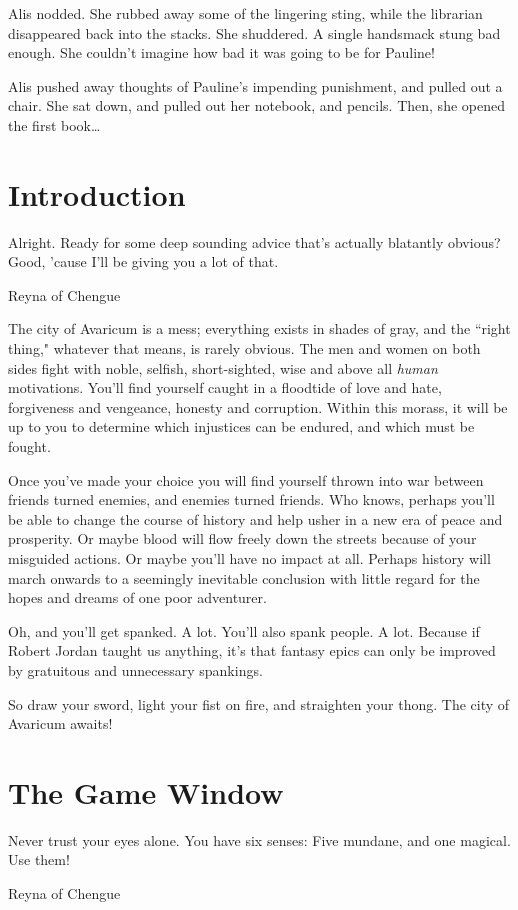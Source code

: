 \documentclass{report}
\begin{document}
Alis nodded. She rubbed away some of the lingering sting, while the librarian disappeared back into the stacks. She shuddered. A single handsmack
stung bad enough. She couldn't imagine how bad it was going to be for Pauline!

Alis pushed away thoughts of Pauline's impending punishment, and pulled out a chair. She sat down, and pulled out her notebook, and pencils. Then,  she opened the 
first book\ldots

\maketitle
\tableofcontents

\chapter{Introduction}
\label{ch_introduction}
\epigraph{Alright. Ready for some deep sounding advice that's actually
blatantly obvious? Good, 'cause I'll be giving you a lot of that.}{Reyna of Chengue}


The city of Avaricum is 
a mess; everything exists in shades of gray, and the ``right thing," whatever that means, is rarely obvious. The men and women on both sides fight with noble, 
selfish, short-sighted, 
wise and above all \emph{human} 
motivations. You'll find yourself caught in a floodtide of love and hate, forgiveness and vengeance, honesty and corruption. Within this morass, it will be up to you to 
determine which injustices can be endured, and which must be fought. 

Once you've made your choice you will find yourself thrown into war between friends turned
enemies, and enemies turned friends. Who knows, perhaps you'll be able to change the course of history and help usher in a new era of peace and prosperity. Or maybe blood 
will flow freely down the streets because of your misguided actions. Or maybe you'll have no impact at all. Perhaps history
will march onwards to a seemingly inevitable conclusion with little regard for the hopes and dreams of one poor adventurer.

Oh, and you'll get spanked. A lot. You'll also spank people. A lot. Because if Robert Jordan taught us anything, it's that fantasy epics can only be improved
by gratuitous and unnecessary spankings.

So draw your sword, light your fist on fire, and straighten your thong. The city of Avaricum awaits!

\chapter{The Game Window}
\label{ch_game_window}
\epigraph{Never trust your eyes alone. You have six senses: Five mundane, and one magical. Use them!}{Reyna of Chengue}
\end{document}
